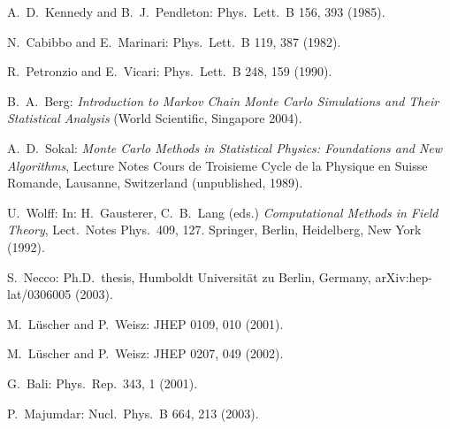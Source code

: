 \begin{enumerate}[label={[\arabic*]}]
  \item A.~D.~Kennedy and B.~J.~Pendleton: Phys.~Lett.~B 156, 393 (1985).
  \item N.~Cabibbo and E.~Marinari: Phys.~Lett.~B 119, 387 (1982).
  \item R.~Petronzio and E.~Vicari: Phys.~Lett.~B 248, 159 (1990).
  \item B.~A.~Berg: \emph{Introduction to Markov Chain Monte Carlo Simulations and
        Their Statistical Analysis} (World Scientific, Singapore 2004).
  \item A.~D.~Sokal: \emph{Monte Carlo Methods in Statistical Physics: Foundations
        and New Algorithms}, Lecture Notes Cours de Troisieme Cycle de la
        Physique en Suisse Romande, Lausanne, Switzerland (unpublished,
        1989).
  \item U.~Wolff: In: H.~Gausterer, C.~B.~Lang (eds.) \emph{Computational Methods
        in Field Theory}, Lect.~Notes Phys.~409, 127. Springer, Berlin,
        Heidelberg, New York (1992).
  \item S.~Necco: Ph.D.~thesis, Humboldt Universit\"at zu Berlin, Germany,
        arXiv:hep-lat/0306005 (2003).
  \item M.~L\"uscher and P.~Weisz: JHEP 0109, 010 (2001).
  \item M.~L\"uscher and P.~Weisz: JHEP 0207, 049 (2002).
  \item G.~Bali: Phys.~Rep.~343, 1 (2001).
  \item P.~Majumdar: Nucl.~Phys.~B 664, 213 (2003).
\end{enumerate}
